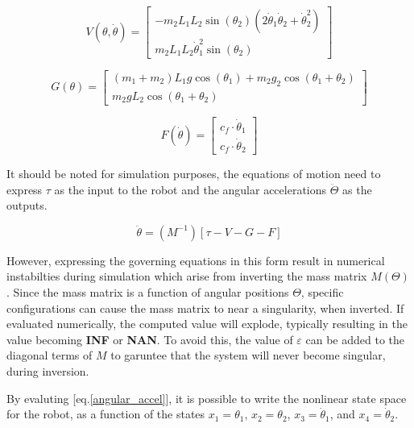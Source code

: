 \documentclass[journal]{IEEEtran}
\begin{document}
\begin{equation}
V(\theta, \dot{\theta})=\left[\begin{array}{c}
-m_{2} L_{1} L_{2} \sin \left(\theta_{2}\right)\left(2 \dot{\theta}_{1} \dot{\theta}_{2}+\dot{\theta}_{2}^{2}\right) \\
m_{2} L_{1} L_{2} \dot{\theta}_{1}^{2} \sin \left(\theta_{2}\right)
\end{array}\right]
\end{equation}


\begin{equation}
G(\theta)=\left[\begin{array}{c}
\left(m_{1}+m_{2}\right) L_{1} g \cos \left(\theta_{1}\right)+m_{2} g_{2} \cos \left(\theta_{1}+\theta_{2}\right) \\
m_{2} g L_{2} \cos \left(\theta_{1}+\theta_{2}\right)
\end{array}\right]
\end{equation}


\begin{equation}
F(\dot{\theta})=\left[\begin{array}{c}
c_{f} \cdot \dot{\theta}_{1} \\
c_{f} \cdot \dot{\theta}_{2}
\end{array}\right]
\end{equation}


It should be noted for simulation purposes, the equations of motion need to express $\tau$ as the input to the robot and the angular accelerations $\ddot{\Theta}$ as the outputs.

\begin{equation} \label{angular_accel}
\ddot{\theta}=(M^{-1})[\tau-V-G-F]
\end{equation}

However, expressing the governing equations in this form result in numerical instabilties during simulation which arise from inverting the mass matrix $M(\Theta)$. Since the mass matrix is a function of angular positions $\Theta$, specific configurations can cause the mass matrix to near a singularity, when inverted. If evaluated numerically, the computed value will explode, typically resulting in the value becoming \textbf{INF} or \textbf{NAN}. To avoid this, the value of $\varepsilon$ can be added to the diagonal terms of $M$ to garuntee that the system will never become singular, during inversion.

By evaluting [eq.\ref{angular_accel}], it is possible to write the nonlinear state space for the robot, as a function of the states $x_{1}=\theta_{1}$, $x_{2}=\theta_{2}$, $x_{3}=\dot{\theta}_{1}$, and $x_{4}=\dot{\theta}_{2}$.
\end{document}
